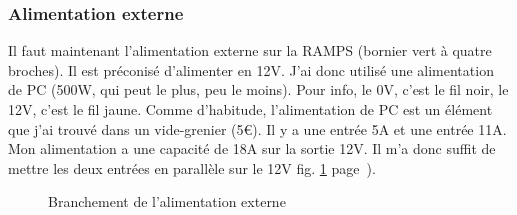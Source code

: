 \subsubsection{Alimentation externe} %
Il faut maintenant l'alimentation externe sur la RAMPS (bornier vert à quatre broches). %
Il est préconisé d'alimenter en 12V. J'ai donc utilisé une alimentation de PC (500W, %
qui peut le plus, peu le moins). Pour info, le 0V, c'est le fil noir, le 12V, c'est le %
fil jaune. Comme d'habitude, l'alimentation de PC est un élément que j'ai trouvé %
dans un vide-grenier (5\euro{}). Il y a une entrée 5A et une entrée 11A. Mon %
alimentation a une capacité de 18A sur la sortie 12V. Il m'a donc suffit de mettre %
les deux entrées en parallèle sur le 12V fig. \ref{alimentation} %
page~\pageref{alimentation}).%
\begin{figure}%
   \caption{\label{alimentation} Branchement de l'alimentation externe}%
\end{figure}%

